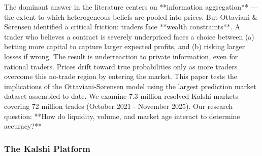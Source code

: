 \documentclass[a4paper,11pt]{article}
\theoremstyle{plain}
\theoremstyle{definition}
\begin{document}
The dominant answer in the literature centers on **information aggregation** — the extent to which heterogeneous beliefs are pooled into prices. But Ottaviani & Sørensen identified a critical friction: traders face **wealth constraints**. A trader who believes a contract is severely underpriced faces a choice between (a) betting more capital to capture larger expected profits, and (b) risking larger losses if wrong. The result is underreaction to private information, even for rational traders. Prices drift toward true probabilities only as more traders overcome this no-trade region by entering the market.
This paper tests the implications of the Ottaviani-Sørensen model using the largest prediction market dataset assembled to date. We examine 7.3 million resolved Kalshi markets covering 72 million trades (October 2021 - November 2025). Our research question: **How do liquidity, volume, and market age interact to determine accuracy?**

\subsubsection{The Kalshi Platform}
\end{document}

